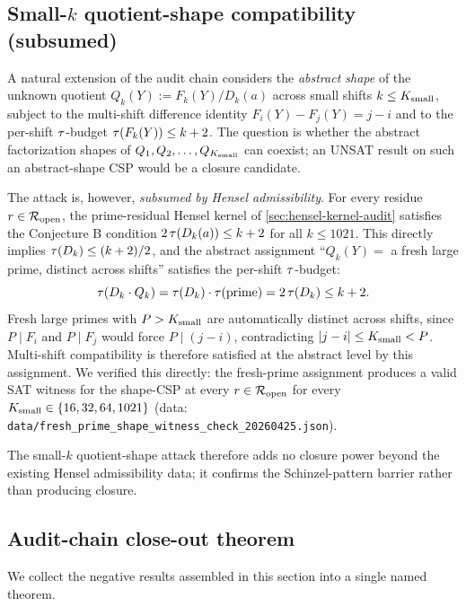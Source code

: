 \subsection{Small-$k$ quotient-shape compatibility (subsumed)}
\label{sec:small-k-shape-compatibility}

A natural extension of the audit chain considers the
\emph{abstract shape} of the unknown quotient
$Q_k(Y) := F_k(Y) / D_k(a)$ across small shifts $k \le K_{\rm small}$,
subject to the multi-shift difference identity
$F_i(Y) - F_j(Y) = j - i$ and to the per-shift $\tau$-budget
$\tau(F_k(Y)) \le k + 2$. The question is whether the abstract
factorization shapes of $Q_1, Q_2, \ldots, Q_{K_{\rm small}}$ can
coexist; an UNSAT result on such an abstract-shape CSP would be a
closure candidate.

The attack is, however, \emph{subsumed by Hensel admissibility}.
For every residue $r \in \mathcal{R}_{\mathrm{open}}$, the prime-residual Hensel kernel
of \cref{sec:hensel-kernel-audit} satisfies the Conjecture B
condition $2\, \tau(D_k(a)) \le k + 2$ for all $k \le 1021$. This
directly implies $\tau(D_k) \le (k+2)/2$, and the abstract
assignment ``$Q_k(Y) = $ a fresh large prime, distinct across
shifts'' satisfies the per-shift $\tau$-budget:
\[
\tau(D_k \cdot Q_k) = \tau(D_k) \cdot \tau(\text{prime})
= 2 \, \tau(D_k) \le k + 2.
\]
Fresh large primes with $P > K_{\rm small}$ are automatically
distinct across shifts, since $P \mid F_i$ and $P \mid F_j$ would
force $P \mid (j - i)$, contradicting $|j - i| \le K_{\rm small} < P$.
Multi-shift compatibility is therefore satisfied at the abstract
level by this assignment. We verified this directly: the
fresh-prime assignment produces a valid SAT witness for the
shape-CSP at every $r \in \mathcal{R}_{\mathrm{open}}$ for every
$K_{\rm small} \in \{16, 32, 64, 1021\}$ (data:
\texttt{data/fresh\_prime\_shape\_witness\_check\_20260425.json}).

The small-$k$ quotient-shape attack therefore adds no closure
power beyond the existing Hensel admissibility data; it confirms
the Schinzel-pattern barrier rather than producing closure.

\subsection{Audit-chain close-out theorem}
\label{sec:audit-chain-closeout}

We collect the negative results assembled in this section into a
single named theorem.

